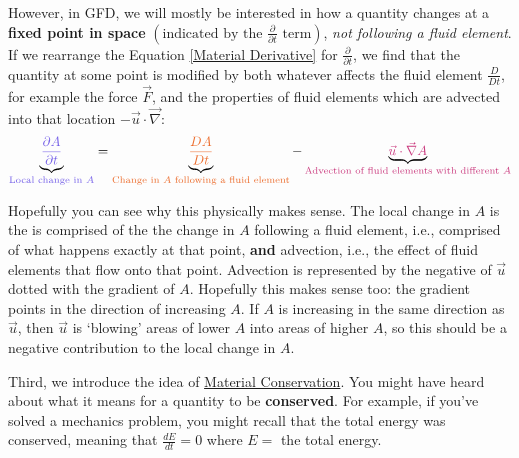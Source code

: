 However, in GFD, we will mostly be interested in how a quantity changes at a \textbf{fixed point in space} \(\left(\text{indicated by the } \frac{\partial}{\partial t} \text{ term}\right)\), \textit{not following a fluid element}. If we rearrange the Equation \ref{Material Derivative} for \( \frac{\partial}{\partial t} \), we find that the quantity at some point is modified by both whatever affects the fluid element \( \frac{D}{D t} \), for example the force \(\vec{F}\), and the properties of fluid elements which are advected into that location \(-\vec{u}\cdot\vec{\nabla}\):
\begin{align}\label{MatDerivTerms}
    \underbrace{
        \textcolor{mydarkblue}{\frac{\partial A}{\partial t}}
        }_{
            \textcolor{mydarkblue}{\text{Local change in }A}
        }
        =
    \underbrace{\textcolor{myorange}{
        \frac{DA}{Dt}}
        }_{{\textcolor{myorange}{\text{Change in }A \text{
             following a fluid element}}}
             }
        -
    \underbrace{\textcolor{mymagenta}{
        \vec{u}\cdot\vec{\nabla}A}
        }_{
            \textcolor{mymagenta}{\text{Advection of fluid elements with different }A}
            }
\end{align}

Hopefully you can see why this physically makes sense. The local change in \(A\) is the is comprised of the the change in \(A\) following a fluid element, i.e., comprised of what happens exactly at that point, \textbf{and} advection, i.e., the effect of fluid elements that flow onto that point. Advection is represented by the negative of \(\vec{u}\) dotted with the gradient of \(A\). Hopefully this makes sense too: the gradient points in the direction of increasing \(A\). If \(A\) is increasing in the same direction as \(\vec{u}\), then \(\vec{u}\) is `blowing' areas of lower \(A\) into areas of higher \(A\), so this should be a negative contribution to the local change in \(A\).

Third, we introduce the idea of \hyperref[Material Conservation]{Material Conservation}. You might have heard about what it means for a quantity to be \textbf{conserved}. For example, if you've solved a mechanics problem, you might recall that the total energy was conserved, meaning that \(\frac{dE}{dt}=0\) where \(E=\) the total energy.

